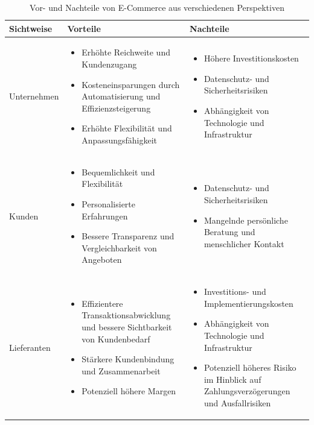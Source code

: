 \documentclass[notitlepage, hidelinks]{article}
\begin{document}
\begin{table}[ht]
\centering
\caption{Vor- und Nachteile von E-Commerce aus verschiedenen Perspektiven}
\label{table:e-commerce}
\begin{tabular}{|l|p{6cm}|p{6cm}|}
\hline
\textbf{Sichtweise} & \textbf{Vorteile} & \textbf{Nachteile} \\
\hline
Unternehmen & \begin{itemize}\item Erhöhte Reichweite und Kundenzugang\item Kosteneinsparungen durch Automatisierung und Effizienzsteigerung\item Erhöhte Flexibilität und Anpassungsfähigkeit\end{itemize} & \begin{itemize}\item Höhere Investitionskosten\item Datenschutz- und Sicherheitsrisiken\item Abhängigkeit von Technologie und Infrastruktur\end{itemize} \\
\hline
Kunden & \begin{itemize}\item Bequemlichkeit und Flexibilität\item Personalisierte Erfahrungen\item Bessere Transparenz und Vergleichbarkeit von Angeboten\end{itemize} & \begin{itemize}\item Datenschutz- und Sicherheitsrisiken\item Mangelnde persönliche Beratung und menschlicher Kontakt\end{itemize} \\
\hline
Lieferanten & \begin{itemize}\item Effizientere Transaktionsabwicklung und bessere Sichtbarkeit von Kundenbedarf\item Stärkere Kundenbindung und Zusammenarbeit\item Potenziell höhere Margen\end{itemize} & \begin{itemize}\item Investitions- und Implementierungskosten\item Abhängigkeit von Technologie und Infrastruktur\item Potenziell höheres Risiko im Hinblick auf Zahlungsverzögerungen und Ausfallrisiken\end{itemize} \\
\hline
\end{tabular}
\end{table}
\end{document}
